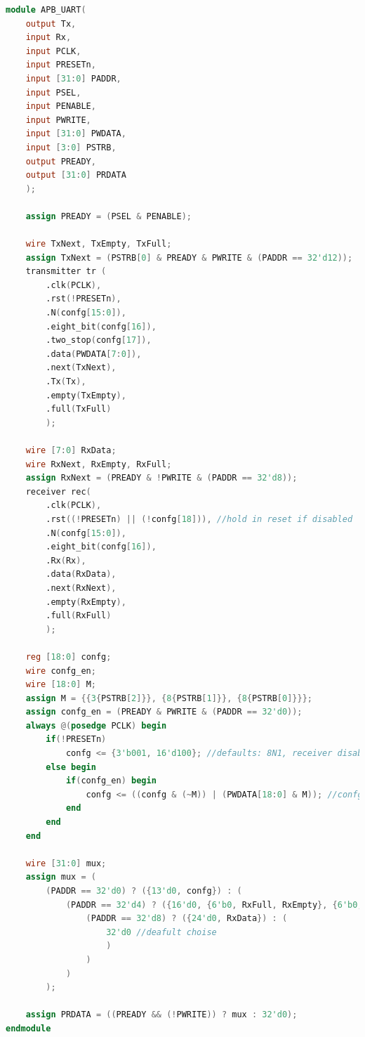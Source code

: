 \begin{lstlisting}[frame=single,language=verilog,caption={APB UART top modul},captionpos=b,label={lst:apb}]
module APB_UART(
    output Tx,
    input Rx,
    input PCLK,
    input PRESETn,
    input [31:0] PADDR,
    input PSEL,
    input PENABLE,
    input PWRITE,
    input [31:0] PWDATA,
    input [3:0] PSTRB,
    output PREADY,
    output [31:0] PRDATA
    );
    
    assign PREADY = (PSEL & PENABLE);
    
    wire TxNext, TxEmpty, TxFull;
    assign TxNext = (PSTRB[0] & PREADY & PWRITE & (PADDR == 32'd12));
    transmitter tr (
        .clk(PCLK),
        .rst(!PRESETn),
        .N(confg[15:0]),
        .eight_bit(confg[16]),
        .two_stop(confg[17]),
        .data(PWDATA[7:0]),
        .next(TxNext),
        .Tx(Tx),
        .empty(TxEmpty),
        .full(TxFull)
        );
    
    wire [7:0] RxData;
    wire RxNext, RxEmpty, RxFull;
    assign RxNext = (PREADY & !PWRITE & (PADDR == 32'd8));
    receiver rec(
        .clk(PCLK),
        .rst((!PRESETn) || (!confg[18])), //hold in reset if disabled
        .N(confg[15:0]),
        .eight_bit(confg[16]),
        .Rx(Rx),
        .data(RxData),
        .next(RxNext),
        .empty(RxEmpty),
        .full(RxFull)
        );
    
    reg [18:0] confg;
    wire confg_en;
    wire [18:0] M;
    assign M = {{3{PSTRB[2]}}, {8{PSTRB[1]}}, {8{PSTRB[0]}}};
    assign confg_en = (PREADY & PWRITE & (PADDR == 32'd0));
    always @(posedge PCLK) begin
        if(!PRESETn)
            confg <= {3'b001, 16'd100}; //defaults: 8N1, receiver disabled, baud=62'500
        else begin
            if(confg_en) begin
                confg <= ((confg & (~M)) | (PWDATA[18:0] & M)); //confg[n]:=(confg[n-1]*~M)+(PWDATA*M) -> only changes the bytes which are set in PSTRB
            end
        end
    end
    
    wire [31:0] mux;
    assign mux = (
        (PADDR == 32'd0) ? ({13'd0, confg}) : (
            (PADDR == 32'd4) ? ({16'd0, {6'b0, RxFull, RxEmpty}, {6'b0, TxFull, TxEmpty}}) : (
                (PADDR == 32'd8) ? ({24'd0, RxData}) : (
                    32'd0 //deafult choise
                    )
                )
            )
        );
    
    assign PRDATA = ((PREADY && (!PWRITE)) ? mux : 32'd0);
endmodule
\end{lstlisting}

